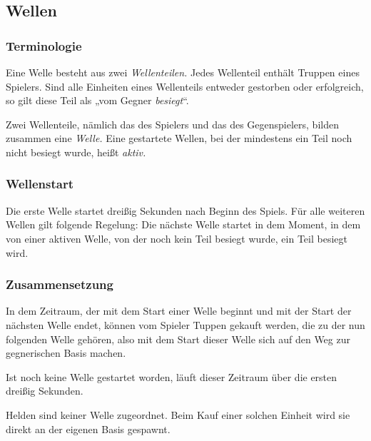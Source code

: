\subsection{Wellen}

\subsubsection{Terminologie}

Eine Welle besteht aus zwei \emph{Wellenteilen.} Jedes Wellenteil enthält
Truppen eines Spielers.  Sind alle Einheiten eines Wellenteils entweder
gestorben oder erfolgreich, so gilt diese Teil als „vom Gegner \emph{besiegt}“.

Zwei Wellenteile, nämlich das des Spielers und das des Gegenspielers, bilden
zusammen eine \emph{Welle.} Eine gestartete Wellen, bei der mindestens ein Teil
noch nicht besiegt wurde, heißt \emph{aktiv.}


\subsubsection{Wellenstart}

Die erste Welle startet dreißig Sekunden nach Beginn des Spiels. Für alle
weiteren Wellen gilt folgende Regelung: Die nächste Welle startet in dem
Moment, in dem von einer aktiven Welle, von der noch kein Teil besiegt wurde,
ein Teil besiegt wird.


\subsubsection{Zusammensetzung}

In dem Zeitraum, der mit dem Start einer Welle beginnt und mit der Start der
nächsten Welle endet, können vom Spieler Tuppen gekauft werden, die zu der nun
folgenden Welle gehören, also mit dem Start dieser Welle sich auf den Weg zur
gegnerischen Basis machen.

Ist noch keine Welle gestartet worden, läuft dieser Zeitraum über die ersten
dreißig Sekunden.

Helden sind keiner Welle zugeordnet. Beim Kauf einer solchen Einheit wird sie
direkt an der eigenen Basis gespawnt.
